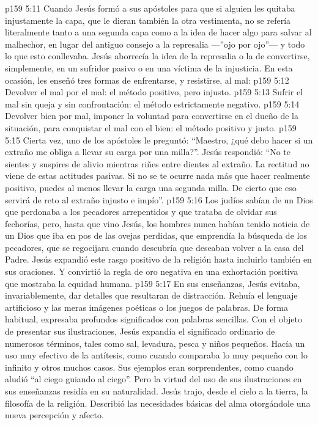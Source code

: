 \vs p159 5:11 Cuando Jesús formó a sus apóstoles para que si alguien les quitaba injustamente la capa, que le dieran también la otra vestimenta, no se refería literalmente tanto a una segunda capa como a la idea de hacer algo  para salvar al malhechor, en lugar del antiguo consejo a la represalia ---”ojo por ojo”--- y todo lo que esto conllevaba. Jesús aborrecía la idea de la represalia o la de convertirse, simplemente, en un sufridor pasivo o en una víctima de la injusticia. En esta ocasión, les enseñó tres formas de enfrentarse, y resistirse, al mal:
\vs p159 5:12 Devolver el mal por el mal: el método positivo, pero injusto.
\vs p159 5:13 Sufrir el mal sin queja y sin confrontación: el método estrictamente negativo.
\vs p159 5:14 Devolver bien por mal, imponer la voluntad para convertirse en el dueño de la situación, para conquistar el mal con el bien: el método positivo y justo.
\vs p159 5:15 \pc Cierta vez, uno de los apóstoles le preguntó: “Maestro, ¿qué debo hacer si un extraño me obliga a llevar su carga por una milla?”. Jesús respondió: “No te sientes y suspires de alivio mientras riñes entre dientes al extraño. La rectitud no viene de estas actitudes pasivas. Si no se te ocurre nada más que hacer realmente positivo, puedes al menos llevar la carga una segunda milla. De cierto que eso servirá de reto al extraño injusto e impío”.
\vs p159 5:16 Los judíos sabían de un Dios que perdonaba a los pecadores arrepentidos y que trataba de olvidar sus fechorías, pero, hasta que vino Jesús, los hombres nunca habían tenido noticia de un Dios que iba en pos de las ovejas perdidas, que emprendía la búsqueda de los pecadores, que se regocijara cuando descubría que deseaban volver a la casa del Padre. Jesús expandió este rasgo positivo de la religión hasta incluirlo también en sus oraciones. Y convirtió la regla de oro negativa en una exhortación positiva que mostraba la equidad humana.
\vs p159 5:17 En sus enseñanzas, Jesús evitaba, invariablemente, dar detalles que resultaran de distracción. Rehuía el lenguaje artificioso y las meras imágenes poéticas o los juegos de palabras. De forma habitual, expresaba profundos significados con palabras sencillas. Con el objeto de presentar sus ilustraciones, Jesús expandía el significado ordinario de numerosos términos, tales como sal, levadura, pesca y niños pequeños. Hacía un uso muy efectivo de la antítesis, como cuando comparaba lo muy pequeño con lo infinito y otros muchos casos. Sus ejemplos eran sorprendentes, como cuando aludió “al ciego guiando al ciego”. Pero la virtud del uso de sus ilustraciones en sus enseñanzas residía en su naturalidad. Jesús trajo, desde el cielo a la tierra, la filosofía de la religión. Describió las necesidades básicas del alma otorgándole una nueva percepción y afecto.
